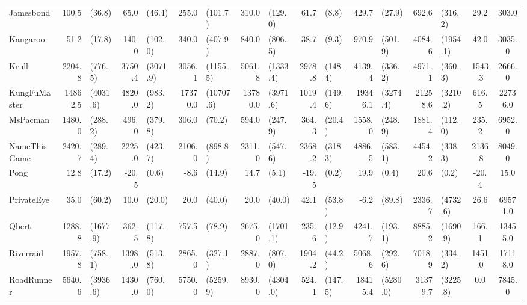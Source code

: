 \begin{landscape}
\begin{changemargin}{0cm}{0cm}
\begin{center}
\begin{table}[!htbp]
\begin{tabular}{lrlrlrlrlrlrlrlcc}
Jamesbond      &    100.5 &     (36.8) &     65.0 &    (46.4) &      255.0 &      (101.7) &    310.0 &    (129.0) &     61.7 &    (8.8) &    429.7 &     (27.9) &     692.6 &    (316.2) &     29.2 &    303.0 \\
Kangaroo       &     51.2 &     (17.8) &    140.0 &   (102.0) &      340.0 &      (407.9) &    840.0 &    (806.5) &     38.7 &    (9.3) &    970.9 &    (501.9) &    4084.6 &   (1954.1) &     42.0 &   3035.0 \\
Krull          &   2204.8 &    (776.5) &   3750.4 &  (3071.9) &     3056.1 &     (1155.5) &   5061.8 &   (1333.4) &   2978.8 &  (148.4) &   4139.4 &    (336.2) &    4971.1 &    (360.3) &   1543.3 &   2666.0 \\
KungFuMaster   &  14862.5 &   (4031.6) &   4820.0 &   (983.2) &    17370.0 &    (10707.6) &  13780.0 &   (3971.6) &   1019.4 &  (149.6) &  19346.1 &   (3274.4) &   21258.6 &   (3210.2) &    616.5 &  22736.0 \\
MsPacman       &   1480.0 &    (288.2) &    496.0 &   (379.8) &      306.0 &       (70.2) &    594.0 &    (247.9) &    364.3 &   (20.4) &   1558.0 &    (248.9) &    1881.4 &    (112.0) &    235.2 &   6952.0 \\
NameThisGame   &   2420.7 &    (289.4) &   2225.0 &   (423.7) &     2106.0 &      (898.8) &   2311.0 &    (547.6) &   2368.2 &  (318.3) &   4886.5 &    (583.1) &    4454.2 &    (338.3) &   2136.8 &   8049.0 \\
Pong           &     12.8 &     (17.2) &    -20.5 &     (0.6) &       -8.6 &       (14.9) &     14.7 &      (5.1) &    -19.5 &    (0.2) &     19.9 &      (0.4) &      20.6 &      (0.2) &    -20.4 &     15.0 \\
PrivateEye     &     35.0 &     (60.2) &     10.0 &    (20.0) &       20.0 &       (40.0) &     20.0 &     (40.0) &     42.1 &   (53.8) &     -6.2 &     (89.8) &    2336.7 &   (4732.6) &     26.6 &  69571.0 \\
Qbert          &   1288.8 &   (1677.9) &    362.5 &   (117.8) &      757.5 &       (78.9) &   2675.0 &   (1701.1) &    235.6 &   (12.9) &   4241.7 &    (193.1) &    8885.2 &   (1690.9) &    166.1 &  13455.0 \\
Riverraid      &   1957.8 &    (758.1) &   1398.0 &   (513.8) &     2865.0 &      (327.1) &   2887.0 &    (807.0) &   1904.2 &   (44.2) &   5068.6 &    (292.6) &    7018.9 &    (334.2) &   1451.0 &  17118.0 \\
RoadRunner     &   5640.6 &   (3936.6) &   1430.0 &   (760.0) &     5750.0 &     (5259.9) &   8930.0 &   (4304.0) &    524.1 &  (147.5) &  18415.4 &   (5280.0) &   31379.7 &   (3225.8) &      0.0 &   7845.0 \\

\end{tabular}
\end{table}
\end{center}
\end{changemargin}
\end{landscape}

